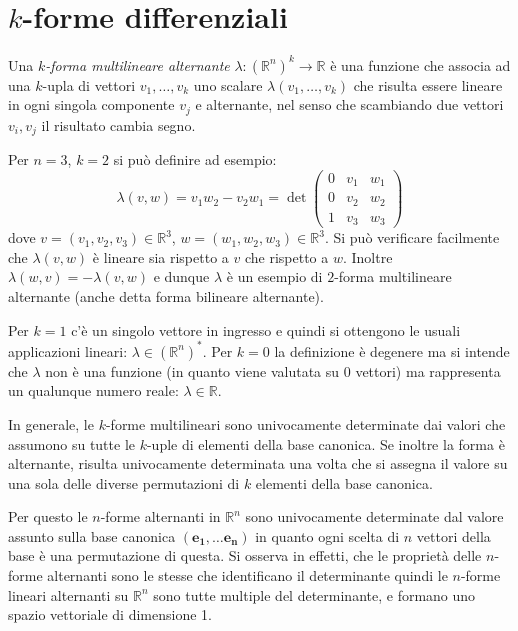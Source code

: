 \documentclass[italian,a4paper]{scrartcl}
\newcommand{\RR}{{\mathbb R}}
\renewcommand{\vec}{\mathbf}
\begin{document}
\section{$k$-forme differenziali}

Una \emph{$k$-forma multilineare alternante} $\lambda\colon (\RR^n)^k \to \RR$ è
una funzione che associa ad una $k$-upla di vettori $v_1,\dots,v_k$
uno scalare $\lambda(v_1,\dots, v_k)$ che risulta essere lineare in
ogni singola componente $v_j$ e alternante, nel senso che scambiando
due vettori $v_i, v_j$ il risultato cambia segno.

\begin{example}
Per $n=3$, $k=2$ si può definire ad esempio:
\[
 \lambda(v, w) = v_1w_2 - v_2w_1
= \det\begin{pmatrix}
0 & v_1 & w_1\\
0 & v_2 & w_2\\
1 & v_3 & w_3
\end{pmatrix}
\]
dove $v=(v_1,v_2,v_3) \in \RR^3$, $w=(w_1,w_2,w_3) \in \RR^3$. Si può
verificare facilmente che $\lambda(v,w)$ è lineare sia rispetto a $v$
che rispetto a $w$. Inoltre $\lambda(w,v) = -\lambda(v,w)$ e dunque
$\lambda$ è un esempio di $2$-forma multilineare alternante (anche
detta forma bilineare alternante).
\end{example}

Per $k=1$ c'è un singolo vettore in ingresso e quindi si ottengono le
usuali applicazioni lineari: $\lambda \in (\RR^n)^*$. Per $k=0$ la definizione è
degenere ma si intende che $\lambda$ non è una funzione (in quanto
viene valutata su $0$ vettori) ma rappresenta un qualunque numero reale:
$\lambda\in \mathbb R$.

In generale,
le $k$-forme multilineari sono univocamente determinate dai valori che
assumono su tutte le $k$-uple di elementi della base canonica. Se
inoltre la forma è alternante, risulta univocamente determinata una
volta che si assegna il valore su una sola delle diverse permutazioni
di $k$ elementi della base canonica.

Per questo le $n$-forme alternanti in
$\RR^n$ sono univocamente determinate dal valore assunto sulla base
canonica $(\vec {e_1},\dots \vec{e_n})$ in quanto ogni scelta di $n$
vettori della base è una permutazione di questa.
Si osserva in effetti, che le proprietà
delle $n$-forme alternanti sono le stesse che identificano il determinante
quindi le
$n$-forme lineari alternanti su $\RR^n$ sono tutte multiple del
determinante, e formano uno spazio vettoriale di dimensione 1.
\end{document}
